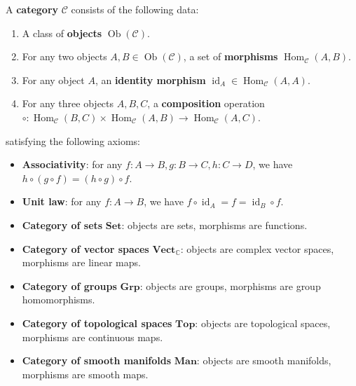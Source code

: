 \begin{definition}[Category]\label{def:category}
A \textbf{category} $\mathcal{C}$ consists of the following data:
\begin{enumerate}[label=(\roman*)]
    \item A class of \textbf{objects} $\operatorname{Ob}(\mathcal{C})$.
    \item For any two objects $A, B \in \operatorname{Ob}(\mathcal{C})$, a set of \textbf{morphisms} $\operatorname{Hom}_{\mathcal{C}}(A, B)$.
    \item For any object $A$, an \textbf{identity morphism} $\operatorname{id}_A \in \operatorname{Hom}_{\mathcal{C}}(A, A)$.
    \item For any three objects $A, B, C$, a \textbf{composition} operation $\circ: \operatorname{Hom}_{\mathcal{C}}(B, C) \times \operatorname{Hom}_{\mathcal{C}}(A, B) \to \operatorname{Hom}_{\mathcal{C}}(A, C)$.
\end{enumerate}
satisfying the following axioms:
\begin{itemize}
    \item \textbf{Associativity}: for any $f: A \to B, g: B \to C, h: C \to D$, we have $h \circ (g \circ f) = (h \circ g) \circ f$.
    \item \textbf{Unit law}: for any $f: A \to B$, we have $f \circ \operatorname{id}_A = f = \operatorname{id}_B \circ f$.
\end{itemize}
\end{definition}

\begin{example}\label{ex:category_instances}
\begin{itemize}
    \item \textbf{Category of sets} $\mathbf{Set}$: objects are sets, morphisms are functions.
    \item \textbf{Category of vector spaces} $\mathbf{Vect}_{\mathbb{C}}$: objects are complex vector spaces, morphisms are linear maps.
    \item \textbf{Category of groups} $\mathbf{Grp}$: objects are groups, morphisms are group homomorphisms.
    \item \textbf{Category of topological spaces} $\mathbf{Top}$: objects are topological spaces, morphisms are continuous maps.
    \item \textbf{Category of smooth manifolds} $\mathbf{Man}$: objects are smooth manifolds, morphisms are smooth maps.
\end{itemize}
\end{example}

